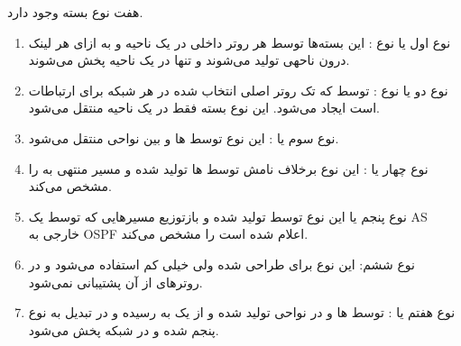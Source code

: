 \documentclass[12pt]{article}
\begin{document}
هفت نوع بسته  وجود دارد.

\begin{enumerate}
	\item نوع اول یا نوع : این بسته‌ها توسط هر روتر داخلی در یک ناحیه و به ازای هر لینک درون ناحهی تولید می‌شوند و تنها در یک ناحیه پخش می‌شوند.
	
	\item نوع دو یا نوع : توسط  که تک روتر اصلی انتخاب شده در هر شبکه برای ارتباطات  است ایجاد می‌شود. این نوع بسته فقط در یک ناحیه منتقل می‌شود.
	
	
	\item نوع سوم یا 
	:
	این نوع توسط  ها و بین نواحی منتقل می‌شود.
	
	\item نوع چهار یا
	:
	این نوع برخلاف نامش توسط  ها تولید شده و مسیر منتهی به  را مشخص می‌کند.
	
	\item نوع پنجم یا 
	این نوع توسط  تولید شده و بازتوزیع مسیر‌هایی که توسط یک AS خارجی به OSPF اعلام شده است را مشخص  می‌کند.
	
	\item نوع ششم: این نوع برای  طراحی شده ولی خیلی کم استفاده می‌شود و در روترهای  از آن پشتیبانی نمی‌شود.
	
	\item نوع هفتم یا :
توسط  ها و در نواحی
تولید شده و از یک 
به
رسیده و در  تبدیل به نوع پنجم شده و در شبکه پخش می‌شود.

\end{enumerate}
\end{document}
